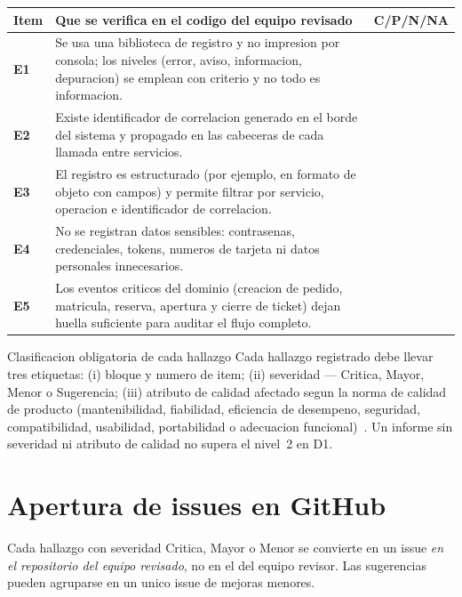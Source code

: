 \documentclass[11pt,a4paper]{article}
\begin{document}
\noindent
\begin{tabularx}{\linewidth}{@{}>{\bfseries}p{0.9cm} X >{\centering\arraybackslash}p{2.4cm}@{}}
    \toprule
    \rowcolor{uteqSoft}\textbf{\color{uteqBlue}Item} & \textbf{\color{uteqBlue}Que se verifica en el codigo del equipo revisado} & \textbf{\color{uteqBlue}C/P/N/NA} \\
    \midrule
    E1 & Se usa una biblioteca de registro y no impresion por consola; los niveles (error, aviso, informacion, depuracion) se emplean con criterio y no todo es informacion. & \\
    E2 & Existe identificador de correlacion generado en el borde del sistema y propagado en las cabeceras de cada llamada entre servicios. & \\
    E3 & El registro es estructurado (por ejemplo, en formato de objeto con campos) y permite filtrar por servicio, operacion e identificador de correlacion. & \\
    E4 & No se registran datos sensibles: contrasenas, credenciales, tokens, numeros de tarjeta ni datos personales innecesarios. & \\
    E5 & Los eventos criticos del dominio (creacion de pedido, matricula, reserva, apertura y cierre de ticket) dejan huella suficiente para auditar el flujo completo. & \\
    \bottomrule
\end{tabularx}

\vspace{6pt}

\begin{uteqbox}{Clasificacion obligatoria de cada hallazgo}
    Cada hallazgo registrado debe llevar tres etiquetas: (i) bloque y numero de item; (ii) severidad --- Critica, Mayor, Menor o Sugerencia; (iii) atributo de calidad afectado segun la norma de calidad de producto (mantenibilidad, fiabilidad, eficiencia de desempeno, seguridad, compatibilidad, usabilidad, portabilidad o adecuacion funcional)~\cite{ISO25010:2023}. Un informe sin severidad ni atributo de calidad no supera el nivel~2 en D1.
\end{uteqbox}

\section{Apertura de issues en GitHub}

Cada hallazgo con severidad Critica, Mayor o Menor se convierte en un issue \emph{en el repositorio del equipo revisado}, no en el del equipo revisor. Las sugerencias pueden agruparse en un unico issue de mejoras menores.
\end{document}
